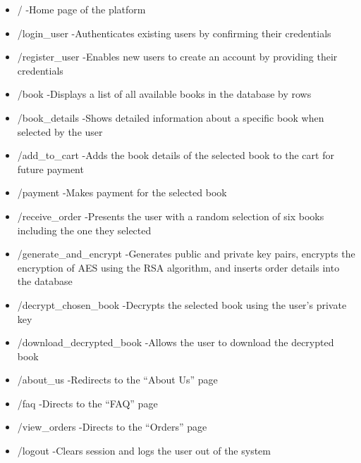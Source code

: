 \documentclass[12pt]{article}
\begin{document}
\begin{itemize}
	\item / -Home page of the platform
	\item /login\_user -Authenticates existing users by confirming their credentials
	\item /register\_user -Enables new users to create an account by providing their credentials
	\item /book -Displays a list of all available books in the database by rows
	\item /book\_details -Shows detailed information about a specific book when selected by the user
	\item /add\_to\_cart -Adds the book details of the selected book to the cart for future payment
	\item /payment -Makes payment for the selected book
	\item /receive\_order -Presents the user with a random selection of six books including the one they selected
	\item /generate\_and\_encrypt -Generates public and private key pairs, encrypts the encryption of AES using the RSA algorithm, and inserts order details into the database
	\item /decrypt\_chosen\_book -Decrypts the selected book using the user’s private key
	\item /download\_decrypted\_book -Allows the user to download the decrypted book
	\item /about\_us -Redirects to the “About Us” page
	\item /faq -Directs to the “FAQ” page
	\item /view\_orders -Directs to the “Orders” page
	\item /logout -Clears session and logs the user out of the system
\end{itemize}
\end{document}

